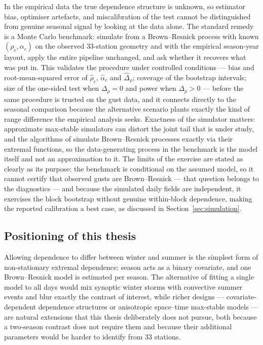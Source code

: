 In the empirical data the true dependence structure is unknown, so estimator bias, optimiser artefacts, and miscalibration of the test cannot be distinguished from genuine seasonal signal by looking at the data alone. The standard remedy is a Monte Carlo benchmark: simulate from a Brown--Resnick process with known \((\rho_c,\alpha_c)\) on the observed \(33\)-station geometry and with the empirical season-year layout, apply the entire pipeline unchanged, and ask whether it recovers what was put in. This validates the procedure under controlled conditions --- bias and root-mean-squared error of \(\widehat\rho_c\), \(\widehat\alpha_c\) and \(\widehat\Delta_\rho\); coverage of the bootstrap intervals; size of the one-sided test when \(\Delta_\rho=0\) and power when \(\Delta_\rho>0\) --- before the same procedure is trusted on the gust data, and it connects directly to the seasonal comparison because the alternative scenario plants exactly the kind of range difference the empirical analysis seeks. Exactness of the simulator matters: approximate max-stable simulators can distort the joint tail that is under study, and the algorithms of \citet{dombry2016} simulate Brown--Resnick processes exactly via their extremal functions, so the data-generating process in the benchmark is the model itself and not an approximation to it. The limits of the exercise are stated as clearly as its purpose: the benchmark is conditional on the assumed model, so it cannot certify that observed gusts are Brown--Resnick --- that question belongs to the diagnostics --- and because the simulated daily fields are independent, it exercises the block bootstrap without genuine within-block dependence, making the reported calibration a best case, as discussed in Section~\ref{sec:simulation}.

\subsection{Positioning of this thesis}\label{sec:lit-seasonal}

Allowing dependence to differ between winter and summer is the simplest form of non-stationary extremal dependence: season acts as a binary covariate, and one Brown--Resnick model is estimated per season. The alternative of fitting a single model to all days would mix synoptic winter storms with convective summer events and blur exactly the contrast of interest, while richer designs --- covariate-dependent dependence structures or anisotropic space--time max-stable models \citep{buhl2016,huserdavison2014} --- are natural extensions that this thesis deliberately does not pursue, both because a two-season contrast does not require them and because their additional parameters would be harder to identify from \(33\) stations.

